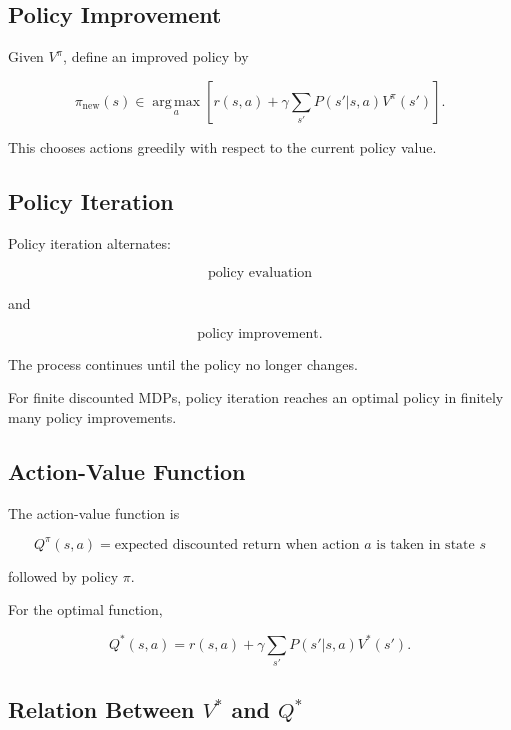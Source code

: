 \subsection{Policy Improvement}
\label{subsec:policy-improvement}

Given \(V^\pi\), define an improved policy by

\[
\boxed{
\pi_{\mathrm{new}}(s)
\in
\operatorname*{arg\,max}_a
\left[
r(s,a)
+
\gamma
\sum_{s'}
P(s'|s,a)
V^\pi(s')
\right].
}
\]

This chooses actions greedily with respect to the current policy value.

\subsection{Policy Iteration}
\label{subsec:policy-iteration}

Policy iteration alternates:

\[
\boxed{
\text{policy evaluation}
}
\]

and

\[
\boxed{
\text{policy improvement}.
}
\]

The process continues until the policy no longer changes.

For finite discounted MDPs, policy iteration reaches an optimal policy in
finitely many policy improvements.

\subsection{Action-Value Function}
\label{subsec:action-value-function}

The action-value function is

\[
\boxed{
Q^\pi(s,a)
=
\text{expected discounted return when action }a
\text{ is taken in state }s
}
\]

followed by policy \(\pi\).

For the optimal function,

\[
\boxed{
Q^*(s,a)
=
r(s,a)
+
\gamma
\sum_{s'}
P(s'|s,a)
V^*(s').
}
\]

\subsection{Relation Between \(V^*\) and \(Q^*\)}
\label{subsec:v-q-relation}


